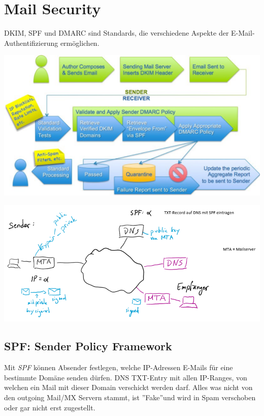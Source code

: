 


\section{Mail Security}
DKIM, SPF und DMARC sind Standards, die verschiedene Aspekte der E-Mail-Authentifizierung ermöglichen.
\begin{center}
    \vspace{-8pt}
    \includegraphics[width=.8\linewidth]{./img/07-mail_security/overview}
    \vspace{-8pt}
\end{center}
\begin{center}
    \vspace{-8pt}
    \includegraphics[width=1.0\linewidth]{./img/07-mail_security/spf_overview}
    \vspace{-8pt}
\end{center}

\subsection{SPF: Sender Policy Framework}
Mit \textit{SPF} können Absender festlegen, welche IP-Adressen E-Mails für eine bestimmte Domäne senden dürfen.
DNS TXT-Entry mit allen IP-Ranges, von welchen ein Mail mit dieser Domain verschickt werden darf.
Alles was nicht von den outgoing Mail/MX Servern stammt, ist ''Fake''und wird in Spam verschoben oder gar nicht erst zugestellt.\\

